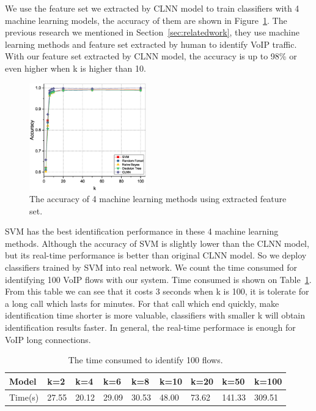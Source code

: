\documentclass[conference]{IEEEtran}
\begin{document}
We use the feature set we extracted by CLNN model to train classifiers with 4 machine learning models, the accuracy of them are shown in Figure~\ref{fig:ml}. The previous research we mentioned in Section~\ref{sec:relatedwork}, they use machine learning methods and feature set extracted by human to identify VoIP traffic. With our feature set extracted by CLNN model, the accuracy is up to 98\% or even higher when k is higher than 10. 
\begin{figure}
  \centering
  \includegraphics[width=0.45\textwidth]{ml.eps}
  \caption{The accuracy of 4 machine learning methods using extracted feature set.}
  \label{fig:ml}
\end{figure}

SVM has the best identification performance in these 4 machine learning methods. Although the accuracy of SVM is slightly lower than the CLNN model, but its real-time performance is better than original CLNN model. So we deploy classifiers trained by SVM into real network. We count the time consumed for identifying 100 VoIP flows with our system. Time consumed is shown on Table~\ref{tab:time4folws}. From this table we can see that it costs 3 seconds when k is 100, it is tolerate for a long call which lasts for minutes. For that call which end quickly, make identification time shorter is more valuable, classifiers with smaller k will obtain identification results faster. In general, the real-time performace is enough for VoIP long connections.
\begin{table}
  \caption{The time consumed to identify 100 flows.}
  \label{tab:time4folws}
  \centering
  \begin{tabular}{p{0.7cm}p{0.5cm}p{0.5cm}p{0.5cm}p{0.5cm}p{0.5cm}p{0.5cm}p{0.6cm}p{0.6cm}}
    \hline
    \textbf{Model} & \textbf{k=2} &\textbf{k=4}&\textbf{k=6}&\textbf{k=8}&\textbf{k=10}&\textbf{k=20}&\textbf{k=50}&\textbf{k=100}\\
    \hline
    Time(s)      & 27.55  & 20.12  &29.09&30.53&48.00&73.62&141.33&309.51  \\
    \hline
  \end{tabular}
\end{table}
\end{document}
